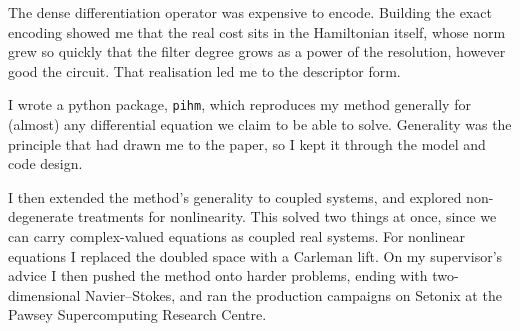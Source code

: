 The dense differentiation operator was expensive to encode. Building the exact encoding showed me that the real cost sits in the Hamiltonian itself, whose norm grew so quickly that the filter degree grows as a power of the resolution, however good the circuit. That realisation led me to the descriptor form.

I wrote a python package, \texttt{pihm}, which reproduces my method generally for (almost) any differential equation we claim to be able to solve. Generality was the principle that had drawn me to the paper, so I kept it through the model and code design.

I then extended the method's generality to coupled systems, and explored non-degenerate treatments for nonlinearity. This solved two things at once, since we can carry complex-valued equations as coupled real systems. For nonlinear equations I replaced the doubled space with a Carleman lift. On my supervisor's advice I then pushed the method onto harder problems, ending with two-dimensional Navier--Stokes, and ran the production campaigns on Setonix at the Pawsey Supercomputing Research Centre.
